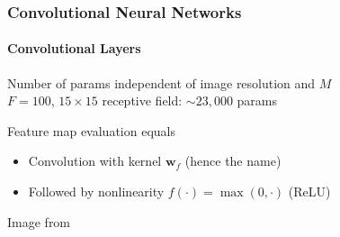 \documentclass[xetex,professionalfont]{beamer}
\renewcommand{\vec}[1]{\ensuremath{\mathbf{#1}}}
\newcommand{\vw}{\vec{w}}
\begin{document}

\begin{frame}
\frametitle{Convolutional Neural Networks}
\framesubtitle{Convolutional Layers}


Number of params independent of image resolution and $M$\\\medskip
$F=100$, $15\times15$ receptive field: $\sim23,000$ params

\bigskip
Feature map evaluation equals
\begin{itemize}
    \item Convolution with kernel $\vw_f$ (hence the name) %
    \item Followed by nonlinearity $f(\cdot)=\max(0,\cdot)$ (ReLU) %
\end{itemize}

\medskip
\begin{center}
    {\centering Image from \cite{krizhevsky2012}}
\end{center}

\end{frame}

\end{document}
